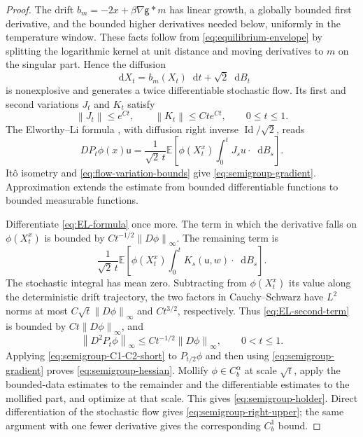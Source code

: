 \documentclass[11pt,reqno]{amsart}
\numberwithin{equation}{section}
\theoremstyle{definition}
\theoremstyle{remark}
\newcommand{\E}{\mathbb E}
\newcommand{\g}{\mathsf g}
\renewcommand{\u}{\mathsf u}
\newcommand{\Id}{\operatorname{Id}}
\newcommand{\dd}{\mathop{}\!\mathrm d}
\newcommand{\norm}[1]{\left\lVert#1\right\rVert}
\begin{document}
\begin{proof}
The drift $b_m=-2x+\beta\nabla\g*m$ has linear growth, a globally bounded first derivative, and the bounded higher derivatives needed below, uniformly in the temperature window. These facts follow from \eqref{eq:equilibrium-envelope} by splitting the logarithmic kernel at unit distance and moving derivatives to $m$ on the singular part. Hence the diffusion
\begin{equation}\label{eq:equilibrium-diffusion}
 \dd X_t=b_m(X_t)\dd t+\sqrt2\dd B_t
\end{equation}
is nonexplosive and generates a twice differentiable stochastic flow. Its first and second variations $J_t$ and $K_t$ satisfy
\begin{equation}\label{eq:flow-variation-bounds}
 \norm{J_t}\leq e^{Ct},\qquad \norm{K_t}\leq Cte^{Ct},
 \qquad 0\leq t\leq1.
\end{equation}
The Elworthy--Li formula \cite[Theorem~2.1, equation~(6)]{ElworthyLi}, with diffusion right inverse $\Id/\sqrt2$, reads
\begin{equation}\label{eq:EL-formula}
 DP_t\phi(x)\u=\frac1{\sqrt2\,t}
 \E\left[\phi(X_t^x)\int_0^tJ_su\cdot\dd B_s\right].
\end{equation}
It\^o isometry and \eqref{eq:flow-variation-bounds} give \eqref{eq:semigroup-gradient}. Approximation extends the estimate from bounded differentiable functions to bounded measurable functions.

Differentiate \eqref{eq:EL-formula} once more. The term in which the derivative falls on $\phi(X_t^x)$ is bounded by $Ct^{-1/2}\norm{D\phi}_\infty$. The remaining term is
\begin{equation}\label{eq:EL-second-term}
 \frac1{\sqrt2\,t}\E\left[
 \phi(X_t^x)\int_0^tK_s(\u,w)\cdot\dd B_s\right].
\end{equation}
The stochastic integral has mean zero. Subtracting from $\phi(X_t^x)$ its value along the deterministic drift trajectory, the two factors in Cauchy--Schwarz have $L^2$ norms at most $C\sqrt t\norm{D\phi}_\infty$ and $Ct^{3/2}$, respectively. Thus \eqref{eq:EL-second-term} is bounded by $Ct\norm{D\phi}_\infty$, and
\begin{equation}\label{eq:semigroup-C1-C2-short}
 \norm{D^2P_t\phi}_\infty\leq Ct^{-1/2}\norm{D\phi}_\infty,
 \qquad 0<t\leq1.
\end{equation}
Applying \eqref{eq:semigroup-C1-C2-short} to $P_{t/2}\phi$ and then using \eqref{eq:semigroup-gradient} proves \eqref{eq:semigroup-hessian}. Mollify $\phi\in C_b^\alpha$ at scale $\sqrt t$, apply the bounded-data estimates to the remainder and the differentiable estimates to the mollified part, and optimize at that scale. This gives \eqref{eq:semigroup-holder}. Direct differentiation of the stochastic flow gives \eqref{eq:semigroup-right-upper}; the same argument with one fewer derivative gives the corresponding $C_b^1$ bound.


\end{proof}
\end{document}
